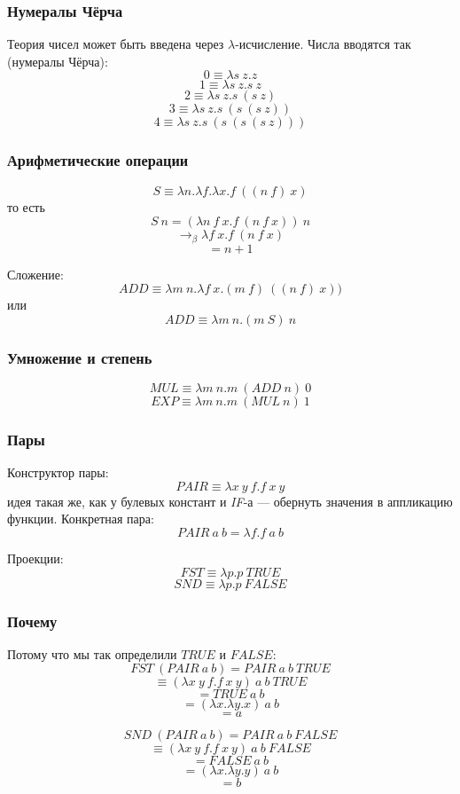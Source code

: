 \documentclass[xetex,mathserif,serif]{beamer}
\begin{document}
	\begin{frame}
		\frametitle{Нумералы Чёрча}
		Теория чисел может быть введена через $\lambda$-исчисление. Числа вводятся так (нумералы Чёрча):
		$$0 \equiv \lambda s\ z.z$$
		$$1 \equiv \lambda s\ z.s\ z$$
		$$2 \equiv \lambda s\ z.s\ (s\ z)$$
		$$3 \equiv \lambda s\ z.s\ (s\ (s\ z))$$
		$$4 \equiv \lambda s\ z.s\ (s\ (s\ (s\ z)))$$
	\end{frame}

	\begin{frame}
		\frametitle{Арифметические операции}
		$$S \equiv \lambda n.\lambda f.\lambda x.f\ ((n\ f)\ x)$$
		то есть
		$$S\ n = (\lambda n\ f\ x.f\ (n\ f\ x))\ n$$
		$$\rightarrow_\beta \lambda f\ x.f\ (n\ f\ x)$$
		$$= n + 1$$
		
		Сложение:
		$$ADD \equiv \lambda m\ n.\lambda f\ x.(m\ f)\ ((n\ f)\ x))$$
		или
		$$ADD \equiv \lambda m\ n.(m\ S)\ n$$
	\end{frame}

	\begin{frame}
		\frametitle{Умножение и степень}
		$$MUL \equiv \lambda m\ n.m\ (ADD\ n)\ 0$$
		$$EXP \equiv \lambda m\ n.m\ (MUL\ n)\ 1$$
	\end{frame}

	\begin{frame}
		\frametitle{Пары}
		Конструктор пары:
		$$PAIR \equiv \lambda x\ y\ f.f\ x\ y$$
		идея такая же, как у булевых констант и \textit{IF}-а --- обернуть значения в аппликацию функции. Конкретная пара:
		$$PAIR\ a\ b = \lambda f.f\ a\ b$$
		
		Проекции:
		$$FST \equiv \lambda p.p\ TRUE$$
		$$SND \equiv \lambda p.p\ FALSE$$
	\end{frame}

	\begin{frame}
		\frametitle{Почему}
		Потому что мы так определили $TRUE$ и $FALSE$:
		$$FST\ (PAIR\ a\ b) = PAIR\ a\ b\ TRUE$$
		$$\equiv (\lambda x\ y\ f.f\ x\ y)\ a\ b\ TRUE$$
		$$= TRUE\ a\ b$$
		$$= (\lambda x.\lambda y.x)\ a\ b$$
		$$= a$$

		$$SND\ (PAIR\ a\ b) = PAIR\ a\ b\ FALSE$$
		$$\equiv (\lambda x\ y\ f.f\ x\ y)\ a\ b\ FALSE$$
		$$= FALSE\ a\ b$$
		$$= (\lambda x.\lambda y.y)\ a\ b$$
		$$= b$$
	\end{frame}
\end{document}
